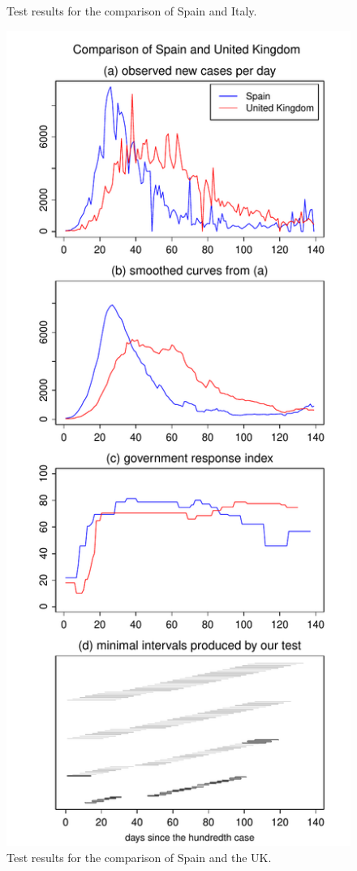 \documentclass[a4paper,12pt]{article}
\numberwithin{equation}{section}
\begin{document}
\begin{figure}[p!]
\begin{minipage}[t]{0.49\textwidth}
\caption{Test results for the comparison of Spain and Italy.}
\end{minipage}
\hspace{0.25cm}
\begin{minipage}[t]{0.49\textwidth}
\includegraphics[width=\textwidth]{plots/ESP_vs_GBR}
\caption{Test results for the comparison of Spain and the UK.}
\end{minipage}
\end{figure}
\end{document}
